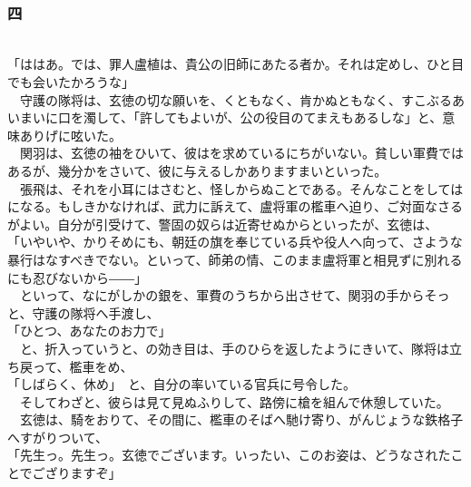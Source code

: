 \documentclass[
  paper=a5,
  fontsize=10pt,
  jafontsize=9.5pt,
  tate,                  %
  open_bracket_pos=nibu, %
]{jlreq}
\begin{document}
\\

\subsubsection{四}

\\


「ははあ。では、罪人盧植は、貴公の旧師にあたる者か。それは定めし、ひと目でも会いたかろうな」\\


　守護の隊将は、玄徳の切な願いを、くともなく、肯かぬともなく、すこぶるあいまいに口を濁して、「許してもよいが、公の役目のてまえもあるしな」と、意味ありげに呟いた。\\


　関羽は、玄徳の袖をひいて、彼はを求めているにちがいない。貧しい軍費ではあるが、幾分かをさいて、彼に与えるしかありますまいといった。\\


　張飛は、それを小耳にはさむと、怪しからぬことである。そんなことをしてはになる。もしきかなければ、武力に訴えて、盧将軍の檻車へ迫り、ご対面なさるがよい。自分が引受けて、警固の奴らは近寄せぬからといったが、玄徳は、\\


「いやいや、かりそめにも、朝廷の旗を奉じている兵や役人へ向って、さような暴行はなすべきでない。といって、師弟の情、このまま盧将軍と相見ずに別れるにも忍びないから――」\\


　といって、なにがしかの銀を、軍費のうちから出させて、関羽の手からそっと、守護の隊将へ手渡し、\\


「ひとつ、あなたのお力で」\\


　と、折入っていうと、の効き目は、手のひらを返したようにきいて、隊将は立ち戻って、檻車をめ、\\


「しばらく、休め」　と、自分の率いている官兵に号令した。\\


　そしてわざと、彼らは見て見ぬふりして、路傍に槍を組んで休憩していた。\\


　玄徳は、騎をおりて、その間に、檻車のそばへ馳け寄り、がんじょうな鉄格子へすがりついて、\\


「先生っ。先生っ。玄徳でございます。いったい、このお姿は、どうなされたことでござりますぞ」\\
\end{document}
